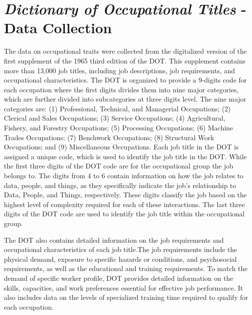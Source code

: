\documentclass[11pt, a4paper, leqno]{article}
\begin{document}
\section{\textit{Dictionary of Occupational Titles} - Data Collection}
The data on occupational traits were collected from the digitalized version of the first supplement of the 1965 third edition of the DOT. This supplement contains more than 13,000 job titles, including job descriptions, job requirements, and occupational characteristics. The DOT is organized to provide a 9-digits code for each occupation where the first digits divides them into nine major categories, which are further divided into subcategories at three digits level. The nine major categories are: (1) Professional, Technical, and Managerial Occupations; (2) Clerical and Sales Occupations; (3) Service Occupations; (4) Agricultural, Fishery, and Forestry Occupations; (5) Processing Occupations; (6) Machine Trades Occupations; (7) Benchwork Occupations; (8) Structural Work Occupations; and (9) Miscellaneous Occupations. Each job title in the DOT is assigned a unique code, which is used to identify the job title in the DOT. While the first three digits of the DOT code are for the  occupational group the job belongs to. The digits from 4 to 6 contain information on how the job relates to data, people, and things, as they specifically indicate the job’s relationship to Data, People, and Things, respectively. These digits classify the job based on the highest level of complexity required for each of these interactions. The last three digits of the DOT code are used to identify the job title within the occupational group.

The DOT also contains detailed information on the job requirements and occupational characteristics of each job title.The job requirements include the physical demand, exposure to specific hazards or conditions, and psychosocial requirements, as well as the educational and training requirements. To match the demand of specific worker profile, DOT provides detailed information on the skills, capacities, and work preferences essential for effective job performance. It also includes data on the levels of specialized training time required to qualify for each occupation.













\newpage
\nocite{*}
\printbibliography
\end{document}
